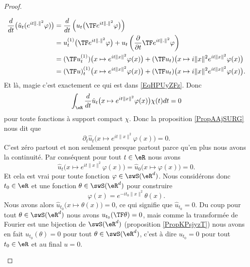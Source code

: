 \begin{proof}
\begin{subproof}
        \begin{subequations}    \label{EqCRGfbLU}
            \begin{align}
            \frac{ d }{ dt }\big( \hat u_t( e^{it\| . \|^2}\varphi) \big)&=\frac{ d }{ dt }\left( u_t\big( \TF e^{it\| . \|^2}\varphi \big) \right)\\
            &=u_t^{(1)}\big( \TF  e^{it\| . \|^2}\varphi \big)+u_t\left( \frac{ \partial  }{ \partial t }\TF e^{it\| . \|^2}\varphi \right)\\
            &=(\TF u_t^{(1)})\big( x\mapsto  e^{it\| x \|^2}\varphi(x) \big)+(\TF u_t)\big( x\mapsto i\| x \|^2 e^{it\| x \|^2}\varphi(x) \big)\\
            &=(\TF u)_t^{(1)}\big( x\mapsto  e^{it\| x \|^2}\varphi(x) \big)+(\TF u_t)\big( x\mapsto i\| x \|^2 e^{it\| x \|^2}\varphi(x) \big).
            \end{align}
        \end{subequations}
        Et là, magie c'est exactement ce qui est dans \eqref{EqHPUyZFz}. Donc
        \begin{equation}
            \int_{\eR}\frac{ d }{ dt }\hat u_t\big( x\mapsto  e^{it\| x \|^2}\varphi(x) \big)\chi(t)dt=0
        \end{equation}
        pour toute fonctions à support compact \( \chi\). Donc la proposition \ref{PropAAjSURG} nous dit que
        \begin{equation}
            \partial_t\hat u_t\big( x\mapsto e^{it\| x \|^2}\varphi(x) \big)=0.
        \end{equation}
        C'est zéro partout et non seulement presque partout parce qu'en plus nous avons la continuité. Par conséquent pour tout \( t\in \eR\) nous avons
        \begin{equation}
            \hat u_t\big( x\mapsto e^{it\| x \|^2}\varphi(x) \big)=\hat u_0\big( x\mapsto \varphi(x)\big)=0.
        \end{equation}
        Et cela est vrai pour toute fonction \( \varphi\in\swS(\eR^d)\). Nous considérons donc \( t_0\in \eR\) et une fonction \( \theta\in\swS(\eR^d)\) pour construire
        \begin{equation}
            \varphi(x)= e^{-it_0\| x \|^2}\theta(x).
        \end{equation}
        Nous avons alors \( \hat u_{t_0}\big( x\mapsto\theta(x) \big)=0\), ce qui signifie que \( \hat u_{t_0}=0\). Du coup pour tout \( \theta\in\swS(\eR^d)\) nous avons \( u_{t_0}(\TF\theta)=0\), mais comme la transformée de Fourier est une bijection de \( \swS(\eR^d)\) (proposition \ref{PropKPsjyzT}) nous avons en fait \( u_{t_0}(\theta)=0\) pour tout \( \theta\in\swS(\eR^d)\), c'est à dire \( u_{t_0}=0\) pour tout \( t_0\in \eR\) et au final \( u=0\).
    \end{subproof}
\end{proof}
